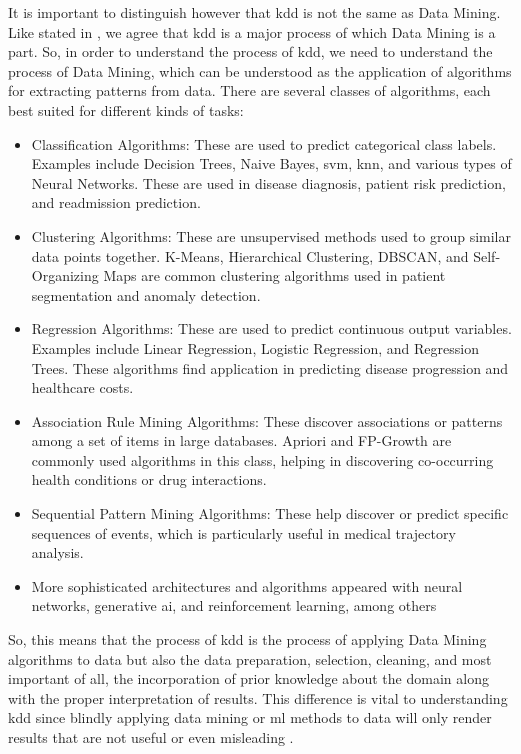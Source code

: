 It is important to distinguish however that \ac{kdd} is not the same as Data Mining. Like stated in \cite{Fayyad_Piatetsky-Shapiro_Smyth_1996}, we agree that \ac{kdd} is a major process of which Data Mining is a part. So, in order to understand the process of \ac{kdd}, we need to understand the process of Data Mining, which can be understood as the application of algorithms for extracting patterns from data. There are several classes of algorithms, each best suited for different kinds of tasks:
\begin{itemize}
    \item Classification Algorithms: These are used to predict categorical class labels. Examples include Decision Trees, Naive Bayes, \ac{svm}, \ac{knn}, and various types of Neural Networks. These are used in disease diagnosis, patient risk prediction, and readmission prediction.
\item Clustering Algorithms: These are unsupervised methods used to group similar data points together. K-Means, Hierarchical Clustering, DBSCAN, and Self-Organizing Maps are common clustering algorithms used in patient segmentation and anomaly detection.

\item Regression Algorithms: These are used to predict continuous output variables. Examples include Linear Regression, Logistic Regression, and Regression Trees. These algorithms find application in predicting disease progression and healthcare costs.

\item Association Rule Mining Algorithms: These discover associations or patterns among a set of items in large databases. Apriori and FP-Growth are commonly used algorithms in this class, helping in discovering co-occurring health conditions or drug interactions.
\item Sequential Pattern Mining Algorithms: These help discover or predict specific sequences of events, which is particularly useful in medical trajectory analysis.

\item More sophisticated architectures and algorithms appeared with neural networks, generative \ac{ai}, and reinforcement learning, among others

\end{itemize}
So, this means that the process of \ac{kdd} is the process of applying Data Mining algorithms to data but also the data preparation, selection, cleaning, and most important of all, the incorporation of prior knowledge about the domain along with the proper interpretation of results. This difference is vital to understanding \ac{kdd} since blindly applying data mining or \ac{ml} methods to data will only render results that are not useful or even misleading \cite{Fayyad_Piatetsky-Shapiro_Smyth_1996}.


